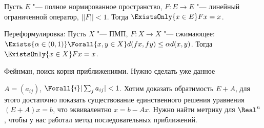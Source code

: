 \begin{theorem}[1922 Банах]
  Пусть $E$ "--- полное нормированное пространство, $F : E \to E$ "---
  линейный ограниченной оператор, $||F|| < 1$. Тогда
  $\ExistsOnly{x \in E} Fx = x$.
\end{theorem}

Переформулировка:
Пусть $X$ "--- ПМП, $F : X \to X$ "--- сжимающее:
$\Exists{\alpha \in (0, 1)} \Forall{x, y \in X}
d(fx, fy) \le \alpha d(x, y)$. Тогда
$\ExistsOnly{x \in X} Fx = x$.

Фейнман, поиск корня приближениями.
Нужно сделать уже данное 

\begin{problem}
  $A = (a_{ij})$, $\Forall{i} |\sum_{j} a_{ij}| < 1$.
  Хотим доказать обратимость $E + A$,
  для этого достаточно показать существование единственного
  решения уравнения $(E + A) x = b$, что эквивалентно
  $x = b - A x$. Нужно найти метрику для $\Real^n$,
  чтобы у нас работал метод последовательных приближений.
\end{problem}


